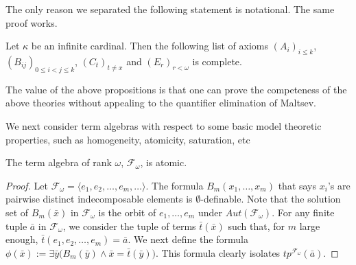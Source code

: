 \documentclass[a4paper,11pt]{article}
\begin{document}

The only reason we separated the following statement is notational. The same proof works.

\begin{theorem}
Let $\kappa$ be an infinite cardinal. Then the following list of axioms $(A_i)_{i\leq k}$, $(B_{ij})_{0\leq i<j\leq k}$, $(C_t)_{t\neq x}$ and $(E_r)_{r<\omega}$ is complete. 
\end{theorem}

The value of the above propositions is that one can prove the competeness of the above theories without appealing to the quantifier elimination of Maltsev. 

We next consider term algebras with respect to some basic model theoretic properties, such as homogeneity, atomicity, saturation, etc  

\begin{proposition}
The term algebra of rank $\omega$, $\mathcal{F}_\omega$, is atomic. 
\end{proposition}
\begin{proof}
Let $\mathcal{F}_\omega=\langle e_1, e_2, \ldots, e_m, \ldots \rangle$. The formula $B_m(x_1, \ldots, x_m)$ that says $x_i$'s are pairwise distinct indecomposable elements is $\emptyset$-definable. Note that the solution set of $B_m(\bar x)$ in $\mathcal{F}_\omega$ is the orbit of $e_1, \ldots, e_m$ under $Aut(\mathcal{F}_\omega)$. For any finite tuple $\bar a$ in $\mathcal{F}_\omega$, we consider the tuple of terms $\bar t(\bar x)$ such that, for $m$ large enough, $\bar t(e_1, e_2, \ldots, e_m)=\bar a$. We next define the formula $\phi(\bar x):=\exists \bar y \big( B_m(\bar y) \land \bar x=\bar t(\bar y)\big)$. This formula clearly isolates $tp^{\mathcal{F}_\omega}(\bar a)$. 
\end{proof}
\end{document}
